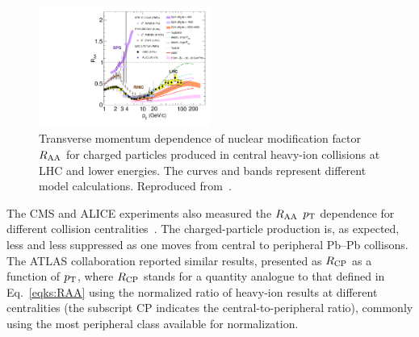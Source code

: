 \begin{figure}
\centering
\includegraphics[width=0.5\textwidth]{ksfigures/CMSRAA.pdf}
\caption{Transverse momentum dependence of nuclear modification factor $R_{\rm AA}$ for charged particles produced in central heavy-ion collisions at LHC and lower energies. The curves and bands represent different model calculations. Reproduced from~\cite{CMS:2012aa}.}
\label{figks:CMSRAA}
\end{figure}

The CMS and ALICE experiments also measured the $R_{\rm AA}$ $p_{\rm T}$ dependence for different collision centralities~\cite{CMS:2012aa,Abelev:2012hxa}. The charged-particle production is, as expected, less and less suppressed as one moves from central to peripheral Pb--Pb collisons. The ATLAS collaboration reported similar results, presented as $R_{\rm CP}$ as a function of $p_{\rm T}$, where $R_{\rm CP}$ stands for a quantity analogue  to that defined in Eq.~\ref{eqks:RAA} using the normalized ratio of heavy-ion results at different centralities (the subscript CP indicates the central-to-peripheral ratio), commonly using the most peripheral class available for normalization.
